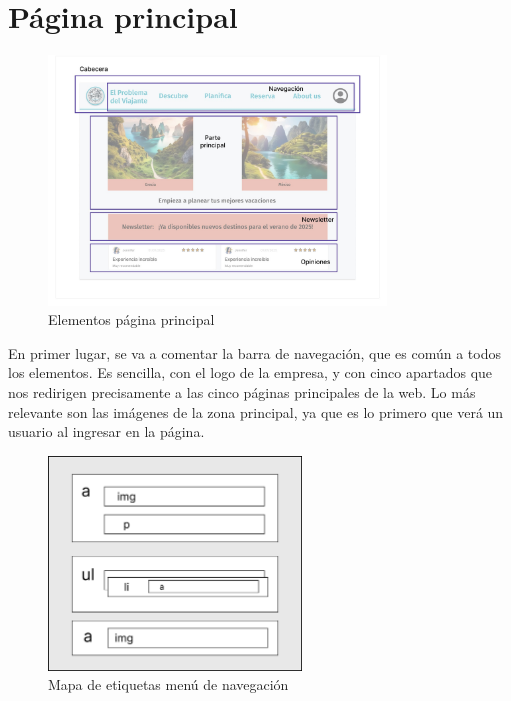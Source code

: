 \documentclass[11pt, a4paper]{book}
\begin{document}
    \section{Página principal}
    
    \begin{figure} [H]
    	\centering
    	\includegraphics[width=0.8\textwidth]{HTML/Doc-principal.jpg}
    	\caption{Elementos página principal}
    \end{figure}

	En primer lugar, se va a comentar la barra de navegación, que es común a todos los elementos. Es sencilla, con el logo de la empresa, y con cinco apartados que nos redirigen precisamente a las cinco páginas principales de la web. Lo más relevante son las imágenes de la zona principal, ya que es lo primero que verá un usuario al ingresar en la página. 
	
	\begin{figure} [H]
		\centering
		\includegraphics[width=0.6\textwidth]{HTML/Etiq-nav.jpg}
		\caption{Mapa de etiquetas menú de navegación}
	\end{figure}
	
\end{document}
